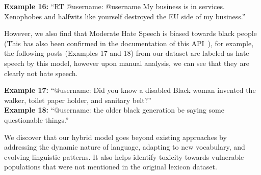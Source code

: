 \vspace{0.1in}
\begin{graybox}
\textbf{Example 16: }``RT @username: @username My business is in services. Xenophobes and halfwits like yourself destroyed the EU side of my business.''
\end{graybox}
\vspace{0.1in}

However, we also find that Moderate Hate Speech is biased towards black people (This has also been confirmed in the documentation of this API~\cite{moderatehatespeech}), for example, the following posts (Examples 17 and 18) from our dataset are labeled as hate speech by this model, however upon manual analysis, we can see that they are clearly not hate speech.

\vspace{0.1in}
\begin{graybox}
\textbf{Example 17: }``@username: Did you know a disabled Black woman invented the walker, toilet paper holder, and sanitary belt?''\\
\textbf{Example 18: }``@username: the older black generation be saying some questionable things.''
\end{graybox}
\vspace{0.1in}

We discover that our hybrid model goes beyond existing approaches by addressing the dynamic nature of language, adapting to new vocabulary, and evolving linguistic patterns. It also helps identify toxicity towards vulnerable populations that were not mentioned in the original lexicon dataset. 